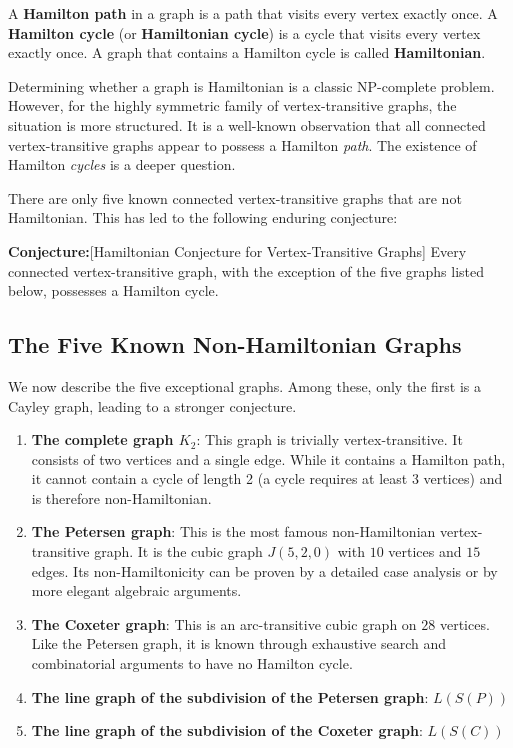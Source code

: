\documentclass[12pt,a4paper,openany]{book}
\begin{document}
A \textbf{Hamilton path} in a graph is a path that visits every vertex exactly once. A \textbf{Hamilton cycle} (or \textbf{Hamiltonian cycle}) is a cycle that visits every vertex exactly once. A graph that contains a Hamilton cycle is called \textbf{Hamiltonian}.

Determining whether a graph is Hamiltonian is a classic NP-complete problem. However, for the highly symmetric family of vertex-transitive graphs, the situation is more structured. It is a well-known observation that all connected vertex-transitive graphs appear to possess a Hamilton \emph{path}. The existence of Hamilton \emph{cycles} is a deeper question.

There are only five known connected vertex-transitive graphs that are not Hamiltonian. This has led to the following enduring conjecture:
\bigskip

\noindent\textbf{Conjecture:}[Hamiltonian Conjecture for Vertex-Transitive Graphs]
Every connected vertex-transitive graph, with the exception of the five graphs listed below, possesses a Hamilton cycle.


\subsection{The Five Known Non-Hamiltonian Graphs}

We now describe the five exceptional graphs. Among these, only the first is a Cayley graph, leading to a stronger conjecture.

\begin{enumerate}
    \item \textbf{The complete graph $K_2$}: This graph is trivially vertex-transitive. It consists of two vertices and a single edge. While it contains a Hamilton path, it cannot contain a cycle of length 2 (a cycle requires at least 3 vertices) and is therefore non-Hamiltonian.

    \item \textbf{The Petersen graph}: This is the most famous non-Hamiltonian vertex-transitive graph. It is the cubic graph $J(5, 2, 0)$ with $10$ vertices and $15$ edges. Its non-Hamiltonicity can be proven by a detailed case analysis or by more elegant algebraic arguments.

    \item \textbf{The Coxeter graph}: This is an arc-transitive cubic graph on $28$ vertices. Like the Petersen graph, it is known through exhaustive search and combinatorial arguments to have no Hamilton cycle.

    \item \textbf{The line graph of the subdivision of the Petersen graph}: $L(S(P))$
    \item \textbf{The line graph of the subdivision of the Coxeter graph}: $L(S(C))$
\end{enumerate}
\end{document}

